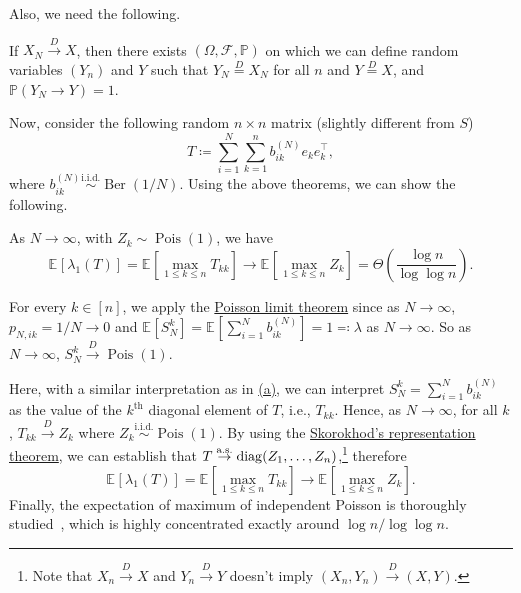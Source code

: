 \begin{answer}
\begin{enumerate}[(a)]
		      Also, we need the following.

		      \begin{theorem}\label{thm:Skorokhod-representation}
			      If \(X_N \overset{D}{\to} X\), then there exists \((\Omega , \mathscr{F} , \mathbb{P} )\) on which we can define random variables \((Y_n)\) and \(Y\) such that \(Y_N \overset{D}{=} X_N\) for all \(n\) and \(Y \overset{D}{=} X\), and \(\mathbb{P} (Y_N \to Y) = 1\).
		      \end{theorem}

		      Now, consider the following random \(n \times n\) matrix (slightly different from \(S\))
		      \[
			      T \coloneqq \sum_{i=1}^{N} \sum_{k=1}^{n} b_{ik}^{(N)} e_k e_k ^{\top} ,
		      \]
		      where \(b_{ik}^{(N)} \overset{\text{i.i.d.} }{\sim } \operatorname{Ber}(1 / N) \). Using the above theorems, we can show the following.

		      \begin{claim}
			      As \(N \to \infty \), with \(Z_k \sim \operatorname{Pois}(1) \), we have
			      \[
				      \mathbb{E}_{}[\lambda _1(T)]
				      = \mathbb{E}_{}\left[ \max _{1 \leq k \leq n} T_{k k} \right]
				      \to \mathbb{E}_{}\left[ \max _{1 \leq k \leq n} Z_k \right]
				      = \Theta \left( \frac{\log n}{\log \log n} \right).
			      \]
		      \end{claim}
		      \begin{explanation}
			      For every \(k \in [n]\), we apply the \hyperref[thm:Poisson-limit]{Poisson limit theorem} since as \(N \to \infty \), \(p_{N, ik} = 1 / N \to 0\) and \(\mathbb{E}_{}[S^k_N] = \mathbb{E}_{}[\sum_{i=1}^{N} b^{(N)}_{ik}] = 1 \eqqcolon \lambda \) as \(N \to \infty \). So as \(N \to \infty \), \(S^k_N \overset{D}{\to} \operatorname{Pois}(1) \).

			      Here, with a similar interpretation as in \hyperref[ex5.4.14:a]{(a)}, we can interpret \(S^k_N = \sum_{i=1}^{N} b^{(N)}_{ik}\) as the value of the \(k^{\text{th} }\) diagonal element of \(T\), i.e., \(T_{k k}\). Hence, as \(N \to \infty \), for all \(k\), \(T_{k k} \overset{D}{\to} Z_k\) where \(Z_k \overset{\text{i.i.d.} }{\sim } \operatorname{Pois}(1) \). By using the \hyperref[thm:Skorokhod-representation]{Skorokhod's representation theorem}, we can establish that \(T \overset{\text{a.s.} }{\to} \operatorname{diag} (Z_1, \dots , Z_n)\),\footnote{Note that \(X_n \overset{D}{\to} X\) and \(Y_n \overset{D}{\to} Y\) doesn't imply \((X_n, Y_n) \overset{D}{\to} (X, Y)\).} therefore
			      \[
				      \mathbb{E}_{}[\lambda _1 (T)]
				      = \mathbb{E}_{}\left[\max _{1 \leq k \leq n} T_{k k}\right]
				      \to \mathbb{E}_{}\left[\max _{1 \leq k \leq n} Z_k \right].
			      \]
			      Finally, the expectation of maximum of independent Poisson is thoroughly studied~\cite{kimber1983note,briggs2009notedistributionmaximumset}, which is highly concentrated exactly around \(\log n / \log \log n\).
		      \end{explanation}


\end{enumerate}
\end{answer}
